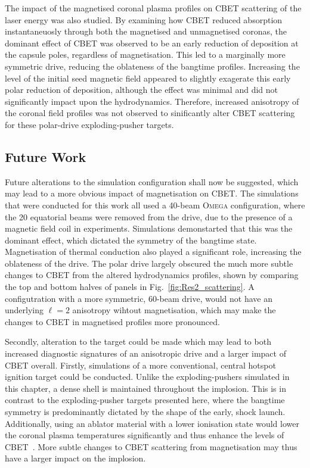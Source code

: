 The impact of the magnetised coronal plasma profiles on \ac{CBET} scattering of the laser energy was also studied.
By examining how \ac{CBET} reduced absorption instantaneuosly through both the magnetised and unmagnetised coronas, the dominant effect of \ac{CBET} was observed to be an early reduction of deposition at the capsule poles, regardless of magnetisation.
This led to a marginally more symmetric drive, reducing the oblateness of the bangtime profiles.
Increasing the level of the initial seed magnetic field appeared to slightly exagerate this early polar reduction of deposition, although the effect was minimal and did not significantly impact upon the hydrodynamics.
Therefore, increased anisotropy of the coronal field profiles was not observed to sinificantly alter \ac{CBET} scattering for these polar-drive exploding-pusher targets.

\subsection{Future Work}%
\label{sec:Res2_future}

Future alterations to the simulation configuration shall now be suggested, which may lead to a more obvious impact of magnetisation on \ac{CBET}.
The simulations that were conducted for this work all used a 40-beam \textsc{Omega} configuration, where the 20 equatorial beams were removed from the drive, due to the presence of a magnetic field coil in experiments.
Simulations demonstarted that this was the dominant effect, which dictated the symmetry of the bangtime state.
Magnetisation of thermal conduction also played a significant role, increasing the oblateness of the drive.
The polar drive largely obscured the much more subtle changes to \ac{CBET} from the altered hydrodynamics profiles, shown by comparing the top and bottom halves of panels in Fig.~\ref{fig:Res2_scattering}.
A configutration with a more symmetric, 60-beam drive, would not have an underlying $\ell=2$ anisotropy wihtout magnetisation, which may make the changes to \ac{CBET} in magnetised profiles more pronounced.

Secondly, alteration to the target could be made which may lead to both increased diagnostic signatures of an anisotropic drive and a larger impact of \ac{CBET} overall.
Firstly, simulations of a more conventional, central hotspot ignition target could be conducted.
Unlike the exploding-pushers simulated in this chapter, a dense shell is maintained throughout the implosion.
This is in contrast to the exploding-pusher targets presented here, where the bangtime symmetry is predominantly dictated by the shape of the early, shock launch.
Additionally, using an ablator material with a lower ionisation state would lower the coronal plasma temperatures significantly and thus enhance the levels of \ac{CBET}~\cite{colaitis_exploration_2023}.
More subtle changes to \ac{CBET} scattering from magnetisation may thus have a larger impact on the implosion.
